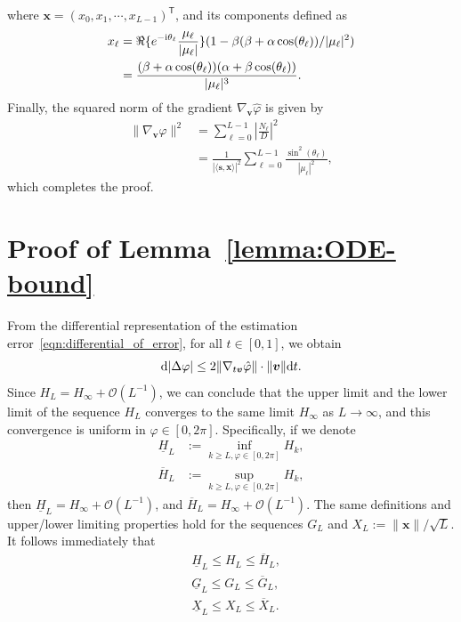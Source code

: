 \documentclass[journal,twocolumn]{IEEEtran}
\theoremstyle{nonumberplain}
\def \T {\bm \Theta}
\def \T {^{\mathsf{T}}}
\def \ri {{\rm i}}
\begin{document}
{    where ${\bm x} = (x_0, x_1, \cdots, x_{L-1})\T$, and its components defined as 
    \begin{equation}
        \begin{aligned}
            x_\ell &= \Re\{ e^{-\ri \theta_\ell} \frac{\mu_\ell}{|\mu_\ell|} \}(1- \beta(\beta+\alpha\cos(\theta_\ell))/|\mu_\ell|^2) \\
            &= \frac{(\beta+\alpha\cos(\theta_\ell))(\alpha+\beta\cos(\theta_\ell))}{|\mu_\ell|^3}. 
        \end{aligned}
    \end{equation}
    Finally, the squared norm of the gradient $\nabla_{\bm v}\hat{\varphi}$ is given by 
    \begin{equation}
        \begin{aligned}
        \|\nabla_{\bm v}\hat{\varphi}\|^2 &= \sum_{\ell=0}^{L-1}\left| \frac{N_\ell}{D} \right|^2 \\
        &= \frac{1}{|\langle {\bm s}, {\bm x}\rangle|^2}\sum_{\ell=0}^{L-1}  \frac{\sin^2(\theta_\ell)}{|\mu_\ell|^2},  
        \end{aligned}
    \end{equation}
    which completes the proof. 

\section{Proof of Lemma~\ref{lemma:ODE-bound}} \label{app:proof_ODE_bound}
From the differential representation of the estimation error~\eqref{eqn:differential_of_error}, for all $t\in[0,1]$, we obtain 
\begin{equation}
    {\rm d}|\Delta\varphi| \leq 2\|\nabla_{t{\bm v}}\hat{\varphi}\|\cdot \|{\bm v}\|{\rm d}t.
\end{equation}
Since $H_L = H_\infty + \mathcal{O}(L^{-1})$, we can conclude that the upper limit and the lower limit of the sequence $H_L$ converges to the same limit $H_\infty$ as $L\to\infty$, and this convergence is uniform in $\varphi\in[0,2\pi]$. Specifically, if we denote 
\begin{equation}
    \begin{aligned}
    \underline{H}_L &:= \inf_{k\geq L, \varphi\in[0,2\pi]}{H_k}, \\
    \overline{H}_L &:= \sup_{k\geq L, \varphi\in[0,2\pi]}{H_k}, 
    \end{aligned}
\end{equation}
then $\underline{H}_L = H_\infty+\mathcal{O}(L^{-1})$, and $\overline{H}_L = H_\infty+\mathcal{O}(L^{-1})$. The same definitions and upper/lower limiting properties hold for the sequences $G_L$ and $X_L := \|{\bm x}\|/\sqrt{L}$. It follows immediately that 
\begin{equation}
    \begin{aligned}
        & \underline{H}_L \leq H_L \leq \overline{H}_L, \\
        & \underline{G}_L \leq G_L \leq \overline{G}_L, \\
        & \underline{X}_L \leq X_L \leq \overline{X}_L. 
    \end{aligned}
\end{equation}

}
\end{document}
